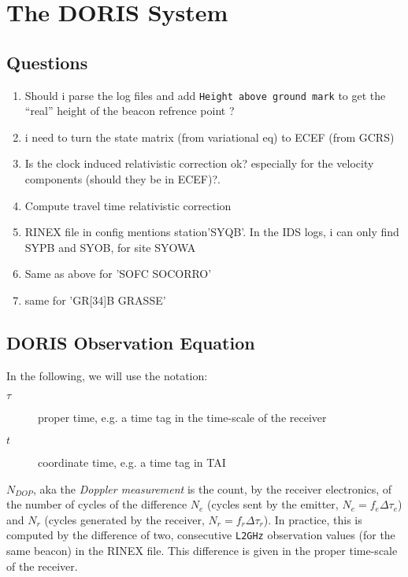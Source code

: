 \chapter{The DORIS System}
\label{ch:doris-system}

\section{Questions}
\begin{enumerate}
  \item Should i parse the log files and add \texttt{Height above ground mark}
    to get the ``real'' height of the beacon refrence point ?

  \item \label{itm:q-state-transition-matrix} i need to turn the state 
  matrix (from variational eq) to ECEF (from GCRS)

  \item \label{itm:q-clock-rel-correction} Is the clock induced relativistic 
  correction ok? especially for the velocity components (should they be in ECEF)?.

  \item \label{itm:q-clock-travel-correction} Compute travel time relativistic 
  correction

  \item RINEX file in config mentions station'SYQB'. In the IDS logs, i can 
  only find SYPB and SYOB, for site SYOWA

  \item Same as above for 'SOFC SOCORRO'

  \item same for 'GR[34]B GRASSE'
\end{enumerate}

\section{DORIS Observation Equation}
\label{sec:doppler-effect}

In the following, we will use the notation:
\begin{description}
  \item[$\tau$] proper time, e.g. a time tag in the time-scale of the receiver
  \item[$t$] coordinate time, e.g. a time tag in TAI
\end{description}

$N_{DOP}$, aka the \emph{Doppler measurement} is the count, by the receiver 
electronics, of the number of cycles of the difference $N_e$ (cycles sent by the 
emitter, $N_e=f_e \Delta \tau_e$) and $N_r$ (cycles generated by the receiver, 
$N_r=f_r \Delta \tau_r$). In practice, this is computed by the difference of two, 
consecutive \texttt{L2GHz} observation values (for the same beacon) in the RINEX file.
This difference is given in the proper time-scale of the receiver.

